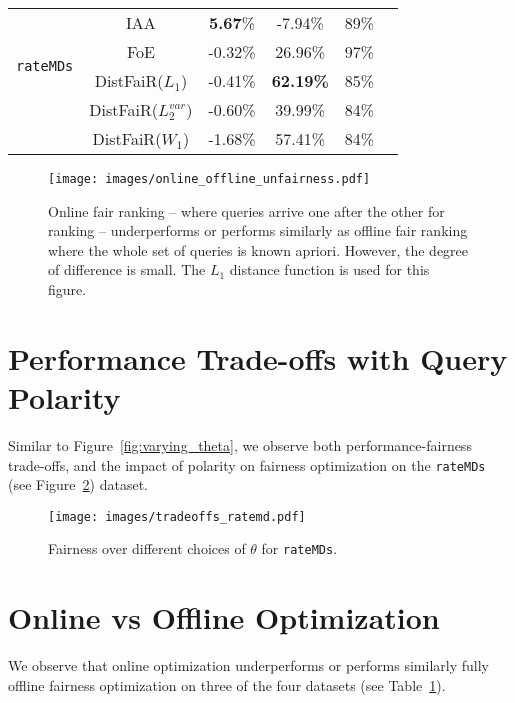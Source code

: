 \begin{table}[htb!]
{\begin{tabular}{lccccc}
\midrule
\multirow{4}{*}{\texttt{rateMDs}} 
& IAA & \textbf{5.67}\% & -7.94\% &  89\% \\
 & FoE & -0.32\% & 26.96\% & 97\% \\

 & DistFaiR($L_1$) &  -0.41\% & \textbf{62.19\%} &  85\%  \\
 & DistFaiR($L_2^{var}$) &  -0.60\% & 39.99\%&  84\% \\
 & DistFaiR($W_1$) &  -1.68\% & 57.41\%&  84\% \\

\bottomrule
\end{tabular}
}
\end{table}





\begin{figure}
    \centering
    \texttt{[image: images/online\_offline\_unfairness.pdf]}
    \caption{Online fair ranking -- where queries arrive one after the other for ranking -- underperforms or performs similarly as offline fair ranking where the whole set of queries is known apriori. However, the degree of difference is small. The $L_1$ distance function is used for this figure.}
    \label{fig:online_offline_optimization}

\end{figure}


\section{Performance Trade-offs with Query Polarity}
Similar to Figure~\ref{fig:varying_theta}, we observe both performance-fairness trade-offs, and the impact of polarity on fairness optimization on the \texttt{rateMDs} (see Figure~\ref{fig:tradeoffs_ratemd}) dataset. 
\begin{figure}
    \centering
    \texttt{[image: images/tradeoffs\_ratemd.pdf]}
    \caption{Fairness over different choices of $\theta$ for \texttt{rateMDs}.}
\label{fig:tradeoffs_ratemd}

\end{figure}

\section{Online vs Offline Optimization}
We observe that online optimization underperforms or performs similarly fully offline fairness optimization on three of the four datasets (see Table~\ref{fig:online_offline_optimization}).


